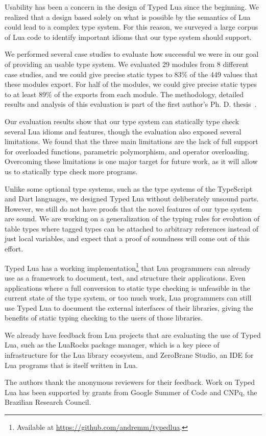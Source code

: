 \documentclass[10pt]{sigplanconf}
\begin{document}
Usability has been a concern in the design of Typed Lua since the beginning. We realized that a design based solely on what
is possible by the semantics of Lua could lead to a 
complex type system. For this reason, we surveyed a large
corpus of Lua code to identify important idioms that
our type system should support.

We performed several
case studies to evaluate how successful we were in our goal of
providing an usable type system.
We evaluated 29 modules from 8 different case studies,
and we could give precise static types to 83\% of the 449
values that these modules export.
For half of the modules, we could give precise static types to
at least 89\% of the exports from each module. The methodology,
detailed results and analysis of this evaluation is part
of the first author's Ph. D. thesis~\cite{maidl2015tl}.

Our evaluation results show that our type system can statically
type check several Lua idioms and features, though the evaluation
also exposed several limitations.
We found that the three main limitations are the lack of
full support for overloaded functions, parametric polymorphism,
and operator overloading.
Overcoming these limitations is one major target for future work,
as it will allow us to statically type check more programs.

Unlike some optional type systems, such as the type systems
of the TypeScript and Dart languages, we designed Typed Lua without deliberately unsound parts.
However, we still do not have proofs that the novel features of
our type system are sound. We are working on a generalization
of the typing rules for evolution of table types where tagged
types can be attached to arbitrary references instead of
just local variables, and expect that a proof of soundness
will come out of this effort.

Typed Lua has a working implementation\footnote{Available at
\url{https://github.com/andremm/typedlua}.}
that Lua programmers can already use as a framework to
document, test, and structure their applications.
Even applications where a full conversion to static
type checking is unfeasible in the current state
of the type system, or too much work,
Lua programmers can still use Typed Lua to document the
external interfaces of their libraries, giving the benefits of static typing
checking to the users of those libraries.

We already have feedback from Lua projects
that are evaluating the use of Typed Lua, such
as the LuaRocks package manager, which is a key
piece of infrastructure for the Lua library ecosystem,
and ZeroBrane Studio, an IDE for Lua programs that is itself
written in Lua.

\acks

The authors thank the anonymous reviewers for their feedback.
Work on Typed Lua has been supported by grants from Google
Summer of Code and CNPq, the Brazilian Research Council.



\end{document}
